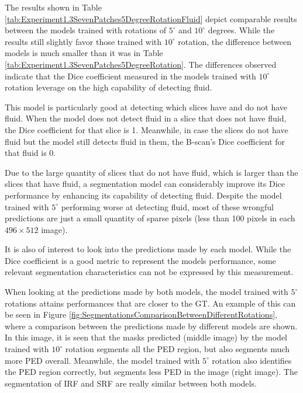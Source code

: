The results shown in Table \ref{tab:Experiment1.3SevenPatches5DegreeRotationFluid} depict comparable results between the models trained with rotations of $5^{\circ}$ and $10^{\circ}$ degrees. While the results still slightly favor those trained with $10^{\circ}$ rotation, the difference between models is much smaller than it was in Table \ref{tab:Experiment1.3SevenPatches5DegreeRotation}. The differences observed indicate that the Dice coefficient measured in the models trained with $10^{\circ}$ rotation leverage on the high capability of detecting fluid. 
\par
This model is particularly good at detecting which slices have and do not have fluid. When the model does not detect fluid in a slice that does not have fluid, the Dice coefficient for that slice is 1. Meanwhile, in case the slices do not have fluid but the model still detects fluid in them, the B-scan's Dice coefficient for that fluid is 0.
\par
Due to the large quantity of slices that do not have fluid, which is larger than the slices that have fluid, a segmentation model can considerably improve its Dice performance by enhancing its capability of detecting fluid. Despite the model trained with $5^{\circ}$ performing worse at detecting fluid, most of these wrongful predictions are just a small quantity of sparse pixels (less than 100 pixels in each $496 \times 512$ image).
\par
It is also of interest to look into the predictions made by each model. While the Dice coefficient is a good metric to represent the models performance, some relevant segmentation characteristics can not be expressed by this measurement.
\par
When looking at the predictions made by both models, the model trained with $5^{\circ}$ rotations attains performances that are closer to the GT. An example of this can be seen in Figure \ref{fig:SegmentationsComparisonBetweenDifferentRotations}, where a comparison between the predictions made by different models are shown. In this image, it is seen that the masks predicted (middle image) by the model trained with $10^{\circ}$ rotation segments all the PED region, but also segments much more PED overall. Meanwhile, the model trained with $5^{\circ}$ rotation also identifies the PED region correctly, but segments less PED in the image (right image). The segmentation of IRF and SRF are really similar between both models.

